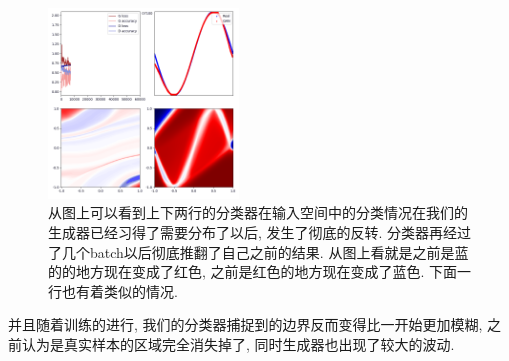 \documentclass[lang=cn,11pt]{elegantpaper}
\begin{document}
\begin{figure}[hbt]
  \includegraphics[width=0.45\textwidth]{sin_3_4}
  \caption{从图上可以看到上下两行的分类器在输入空间中的分类情况在我们的生成器已经习得了需要分布了以后, 发生了彻底的反转. 分类器再经过了几个batch以后彻底推翻了自己之前的结果. 从图上看就是之前是蓝的的地方现在变成了红色, 之前是红色的地方现在变成了蓝色. 下面一行也有着类似的情况.}
\end{figure}

并且随着训练的进行, 我们的分类器捕捉到的边界反而变得比一开始更加模糊, 之前认为是真实样本的区域完全消失掉了, 同时生成器也出现了较大的波动.
\end{document}
